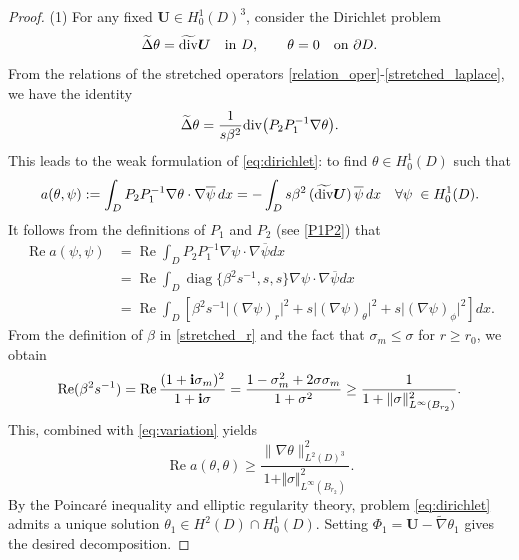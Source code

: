\documentclass[11pt]{article}
\newcommand{\pa}{\partial}
\newcommand{\dive}{{\rm div}}
\newcommand{\sig}{\sigma}
\newcommand{\wid}{\widetilde}
\newcommand{\bs}{\boldsymbol}
\providecommand{\Rp}{\operatorname{Re}}%
\providecommand{\Diag}{\operatorname{diag}}%
\begin{document}
\begin{proof}
(1) For any fixed $\bs{U}\in H_0^1(D)^3$, consider the Dirichlet problem
\begin{equation}\label{eq:dirichlet}
\wid{\Delta}\theta = \wid{\dive}\bs{U} \quad\text{in } D, \qquad \theta = 0 \quad\text{on } \pa D .
\end{equation}
From the relations of the stretched operators \eqref{relation_oper}-\eqref{stretched_laplace}, 
we have the identity
\begin{equation}
\wid{\Delta}\theta = \frac{1}{s\beta^2}\dive\bigl(P_2P_1^{-1}\nabla\theta\bigr).
\end{equation}
This leads to the weak formulation of \eqref{eq:dirichlet}: to find $\theta\in H_0^1(D)$ such that
\begin{equation*}
a(\theta,\psi):=\int_D P_2P_1^{-1}\nabla\theta\cdot\nabla\overline{\psi}\,dx
= -\int_D s\beta^2\,(\wid{\dive}\bs{U})\,\overline{\psi}\,dx
\quad \forall \psi\;\in H_0^1(D).
\end{equation*}
It follows from the definitions of $P_1$ and $P_2$ (see \eqref{P1P2}) that
\begin{equation}\label{eq:variation}
\begin{aligned}
\Rp a(\psi,\psi)&=\Rp\int_{D}P_2P_1^{-1}\nabla \psi\cdot\nabla\overline{\psi}dx \\
&= \Rp\int_{D}\Diag\{\beta^2s^{-1},s,s\}\nabla \psi\cdot\nabla\overline{\psi}dx \\
&=\Rp\int_{D}\left[\beta^2s^{-1}\vert (\nabla \psi)_r \vert^2+s\vert (\nabla \psi)_\theta\vert^2
+s\vert (\nabla \psi)_\phi \vert^2\right]dx.
\end{aligned}
\end{equation}
From the definition of $\beta$ in \eqref{stretched_r} and the fact that $\sig_m\le\sig$ for $r\ge r_0$, we obtain
\begin{equation}\label{bs_lower_bound}
\Rp(\beta^2s^{-1}) = \Rp\frac{(1+{\bf i}\sig_m)^2}{1+{\bf i}\sig} = \frac{1-\sig_m^2+2\sig\sig_m}{1+\sig^2} 
\geq \frac{1}{1+\Vert\sig\Vert_{L^{\infty}(B_{r_2})}^2}.
\end{equation}
This, combined with \eqref{eq:variation} yields
\begin{equation}\label{lowerbound_a}
\Rp a(\theta,\theta) \geq
\frac{\lVert \nabla \theta \rVert_{{L^2(D)^3}}^2}{1+\Vert\sig\Vert_{L^{\infty}(B_{r_2})}^2}.
\end{equation}
By the Poincar\'e inequality and elliptic regularity theory, problem \eqref{eq:dirichlet} 
admits a unique solution $\theta_1\in H^2(D)\cap H_0^1(D)$. Setting $\Phi_1 = \bs{U} - 
\wid{\nabla}\theta_1$ gives the desired decomposition.


\end{proof}
\end{document}

